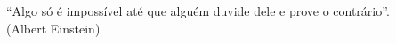 \begin{epigrafe}
    \vspace*{\fill}
	\begin{flushright}
``Algo só é impossível até que alguém duvide dele e prove o contrário''.\\
(Albert Einstein)
	\end{flushright}
\end{epigrafe}